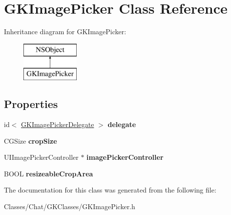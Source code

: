 \hypertarget{interface_g_k_image_picker}{}\section{G\+K\+Image\+Picker Class Reference}
\label{interface_g_k_image_picker}
Inheritance diagram for G\+K\+Image\+Picker\+:\begin{figure}[H]
\begin{center}
\leavevmode
\includegraphics[height=2.000000cm]{interface_g_k_image_picker}
\end{center}
\end{figure}
\subsection*{Properties}
\begin{DoxyCompactItemize}
\item 
\hypertarget{interface_g_k_image_picker_a44de274e33cd43b87fb38097addf487e}{}id$<$ \hyperlink{protocol_g_k_image_picker_delegate-p}{G\+K\+Image\+Picker\+Delegate} $>$ {\bfseries delegate}\label{interface_g_k_image_picker_a44de274e33cd43b87fb38097addf487e}

\item 
\hypertarget{interface_g_k_image_picker_a5a1aa24323b0664d8950e245efdbc6d4}{}C\+G\+Size {\bfseries crop\+Size}\label{interface_g_k_image_picker_a5a1aa24323b0664d8950e245efdbc6d4}

\item 
\hypertarget{interface_g_k_image_picker_a7aa10ebc999406e79686e90b2daac152}{}U\+I\+Image\+Picker\+Controller $\ast$ {\bfseries image\+Picker\+Controller}\label{interface_g_k_image_picker_a7aa10ebc999406e79686e90b2daac152}

\item 
\hypertarget{interface_g_k_image_picker_a0db23b6999567fb7515b060b9970f129}{}B\+O\+O\+L {\bfseries resizeable\+Crop\+Area}\label{interface_g_k_image_picker_a0db23b6999567fb7515b060b9970f129}

\end{DoxyCompactItemize}


The documentation for this class was generated from the following file\+:\begin{DoxyCompactItemize}
\item 
Classes/\+Chat/\+G\+K\+Classes/G\+K\+Image\+Picker.\+h\end{DoxyCompactItemize}

